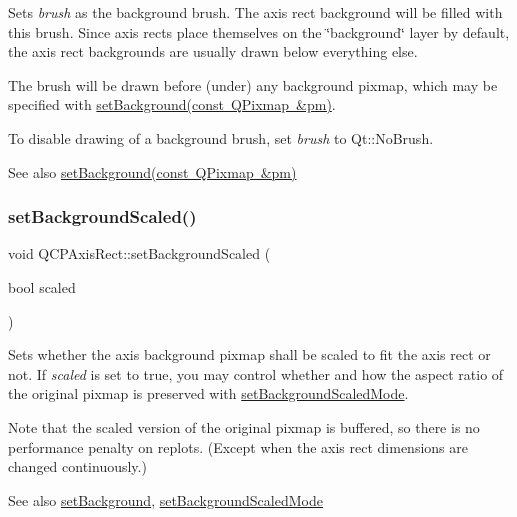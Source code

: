 Sets {\itshape brush} as the background brush. The axis rect background will be filled with this brush. Since axis rects place themselves on the \char`\"{}background\char`\"{} layer by default, the axis rect backgrounds are usually drawn below everything else.

The brush will be drawn before (under) any background pixmap, which may be specified with \mbox{\hyperlink{class_q_c_p_axis_rect_af615ab5e52b8e0a9a0eff415b6559db5}{set\+Background(const Q\+Pixmap \&pm)}}.

To disable drawing of a background brush, set {\itshape brush} to Qt\+::\+No\+Brush.

\begin{DoxySeeAlso}{See also}
\mbox{\hyperlink{class_q_c_p_axis_rect_af615ab5e52b8e0a9a0eff415b6559db5}{set\+Background(const Q\+Pixmap \&pm)}} 
\end{DoxySeeAlso}
\mbox{\label{class_q_c_p_axis_rect_ae6d36c3e0e968ffb991170a018e7b503}} 
\subsubsection{\texorpdfstring{set\+Background\+Scaled()}{setBackgroundScaled()}}
{\footnotesize\ttfamily void Q\+C\+P\+Axis\+Rect\+::set\+Background\+Scaled (\begin{DoxyParamCaption}\item[{bool}]{scaled }\end{DoxyParamCaption})}

Sets whether the axis background pixmap shall be scaled to fit the axis rect or not. If {\itshape scaled} is set to true, you may control whether and how the aspect ratio of the original pixmap is preserved with \mbox{\hyperlink{class_q_c_p_axis_rect_a5ef77ea829c9de7ba248e473f48f7305}{set\+Background\+Scaled\+Mode}}.

Note that the scaled version of the original pixmap is buffered, so there is no performance penalty on replots. (Except when the axis rect dimensions are changed continuously.)

\begin{DoxySeeAlso}{See also}
\mbox{\hyperlink{class_q_c_p_axis_rect_af615ab5e52b8e0a9a0eff415b6559db5}{set\+Background}}, \mbox{\hyperlink{class_q_c_p_axis_rect_a5ef77ea829c9de7ba248e473f48f7305}{set\+Background\+Scaled\+Mode}} 
\end{DoxySeeAlso}
\mbox{\label{class_q_c_p_axis_rect_a5ef77ea829c9de7ba248e473f48f7305}} 
